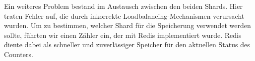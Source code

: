 \documentclass[12pt]{report}
\begin{document}
	Ein weiteres Problem bestand im Austausch zwischen den beiden Shards. Hier traten Fehler auf, die durch inkorrekte Loadbalancing-Mechanismen verursacht wurden. Um zu bestimmen, welcher Shard für die Speicherung verwendet werden sollte, führten wir einen Zähler ein, der mit Redis implementiert wurde. Redis diente dabei als schneller und zuverlässiger Speicher für den aktuellen Status des Counters.

\newpage
{}
\setcounter{page}{\value{frontmatterPage}} %
\addtocounter{page}{1}

\renewcommand{\refname}{Literaturverzeichnis}


\end{document}

